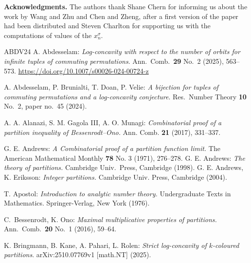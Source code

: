 \documentclass[11pt,reqno]{amsart}
\theoremstyle{plain}
\theoremstyle{remark}
\theoremstyle{definition}
\numberwithin{equation}{section}
\begin{document}
{\bf Acknowledgments.}
The authors thank Shane Chern for informing us
about the work by
Wang and Zhu
and Chen and Zheng, after a first version of the paper had been distributed
and Steven Charlton for supporting us with the computations of
values of the $x_{n}^{\sigma }$.
\begin{thebibliography}{ABDV24}
 A. Abdesselam:
\emph{Log-concavity with respect to the number of orbits for infinite tuples of commuting permutations\/}. Ann.\ Comb.\
\textbf{29}
No.\ 2 (2025), 563--573.
\url{https://doi.org/10.1007/s00026-024-00724-z}

A. Abdesselam, P. Brunialti, T. Doan,
P. Velie:
\emph{A bijection for tuples of commuting permutations
	and a log-concavity conjecture\/}.
Res.\ Number Theory \textbf{10}
No.\ 2, paper no.\ 45 (2024).









 A. A. Alanazi, S. M. Gagola III, A. O. Munagi: \emph{Combinatorial proof of a partition inequality of Bessenrodt--Ono.}
Ann. Comb. 
\textbf{21} (2017), 331--337.  

 G.
E. Andrews: \emph{A Combinatorial
proof of a
partition
function
limit.\/}
The American Mathematical Monthly \textbf{78} No. 3 (1971), 276--278.
\bibitem[An98]{An98} G. E. Andrews: \emph{The theory of partitions.} Cambridge Univ.\ Press, Cambridge (1998).
\bibitem[AE04]{AE04} G. E. Andrews, K. Eriksson: \emph{Integer
partitions.\/}
Cambridge Univ. Press, Cambridge (2004).

 T. Apostol: \emph{Introduction to
analytic
number
theory.\/} Undergraduate Texts in Mathematics. Springer-Verlag, New York
(1976).

 C.~Bessenrodt, K. Ono: \emph{Maximal multiplicative properties of partitions.\/}
Ann.\ Comb.\
\textbf{20} No.\ 1 (2016), 59--64.


  K. Bringmann, B. Kane, A. Pahari, L. Rolen:
\emph{Strict
log-concavity of $k$-coloured
partitions\/}.
arXiv:2510.07769v1 [math.NT] (2025).


\end{thebibliography}
\end{document}
